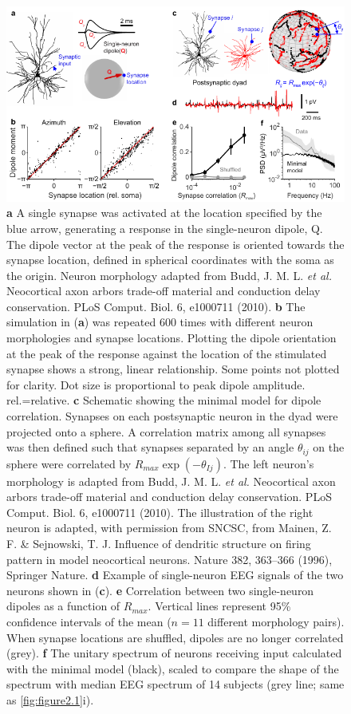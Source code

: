 \begin{figure}[t!]
    \centering
    \includegraphics[width=125mm]{Figures/chapter2/figure3.pdf}
    \caption{
	\textbf{a} A single synapse was activated at the location specified by the blue arrow, generating a response in the single-neuron dipole, Q. The dipole vector at the peak of the response is oriented towards the synapse location, defined in spherical coordinates with the soma as the origin. Neuron morphology adapted from Budd, J. M. L. \textit{et al.} Neocortical axon arbors trade-off material and conduction delay conservation. PLoS Comput. Biol. 6, e1000711 (2010).
	\textbf{b} The simulation in (\textbf{a}) was repeated 600 times with different neuron morphologies and synapse locations. Plotting the dipole orientation at the peak of the response against the location of the stimulated synapse shows a strong, linear relationship. Some points not plotted for clarity. Dot size is proportional to peak dipole amplitude. rel.=relative. 
	\textbf{c} Schematic showing the minimal model for dipole correlation. Synapses on each postsynaptic neuron in the dyad were projected onto a sphere. A correlation matrix among all synapses was then defined such that synapses separated by an angle $\theta_{ij}$ on the sphere were correlated by $R_{max}\exp{(-\theta_{Ij})}$. The left neuron’s morphology is adapted from Budd, J. M. L. \textit{et al.} Neocortical axon arbors trade-off material and conduction delay conservation. PLoS Comput. Biol. 6, e1000711 (2010). The illustration of the right neuron is adapted, with permission from SNCSC, from Mainen, Z. F. \& Sejnowski, T. J. Influence of dendritic structure on firing pattern in model neocortical neurons. Nature 382, 363–366 (1996), Springer Nature.
	\textbf{d} Example of single-neuron EEG signals of the two neurons shown in (\textbf{c}).
	\textbf{e} Correlation between two single-neuron dipoles as a function of $R_{max}$. Vertical lines represent 95\% confidence intervals of the mean ($n=11$ different morphology pairs). When synapse locations are shuffled, dipoles are no longer correlated (grey).
	\textbf{f} The unitary spectrum of neurons receiving input calculated with the minimal model (black), scaled to compare the shape of the spectrum with median EEG spectrum of 14 subjects (grey line; same as \autoref{fig:figure2.1}i).} 
    \label{fig:figure2.3}
\end{figure}


